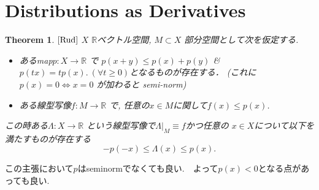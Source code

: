 \documentclass[dvipdfmx,a4paper,11pt]{article} %
\newtheorem{thm}{Theorem}[section]
\theoremstyle{definition}
\theoremstyle{remark}
\numberwithin{equation}{section}
\newcommand{\R}{\mathbb{R}}
\begin{document}


\section{Distributions as Derivatives}

\begin{tcolorbox}[mybox]
\begin{thm}{$\cite[Thm 3.2]{Rud}$}
\label{thm-H-2.3}
\(X\) $\R$ベクトル空間, \(M \subset X\) 部分空間として次を仮定する.
\begin{itemize}
\item あるmap\(p : X \to \mathbb{R}\) で
 \(p(x+y) \leq p(x)+p(y)\) \& \(p(tx) = t p(x).\ (\forall t \geq 0)\)となるものが存在する．
 (これに \(p(x)=0 \Leftrightarrow x=0\) が加わると semi-norm)
\item ある線型写像\(f : M \to \mathbb{R}\) で, 任意の\(x \in M\)に関して\(f(x) \leq p(x)\).
\end{itemize}
この時ある\(\Lambda : X \to \mathbb{R}\) という線型写像で\(\Lambda|_M \equiv f\)かつ任意の \(x \in X\)について以下を満たすものが存在する
\[
 -p(-x) \leq \Lambda(x) \leq p(x).
\]
\end{thm}
\end{tcolorbox}

この主張において$p$はseminormでなくても良い.　よって$p(x)<0$となる点があっても良い. 
\end{document}
